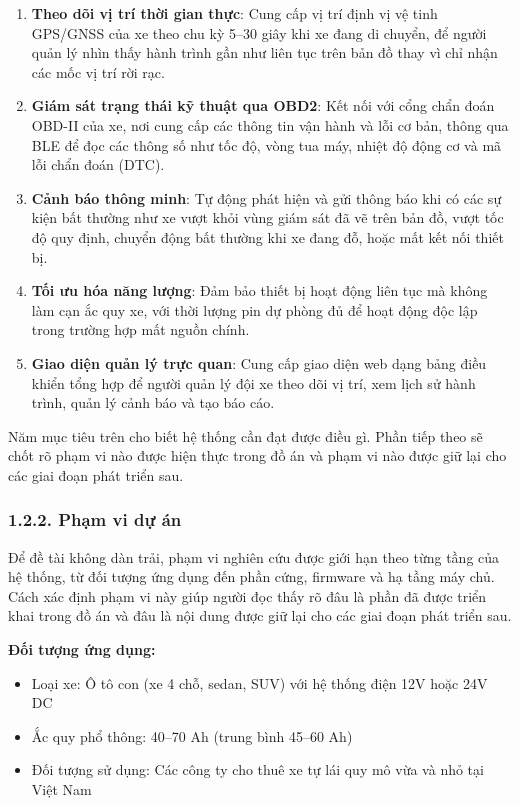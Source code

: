 \documentclass[a4paper]{extarticle}
\providecommand{\tightlist}{%
  \setlength{\itemsep}{0pt}\setlength{\parskip}{0pt}}
\begin{document}
\begin{enumerate}
\def\labelenumi{\arabic{enumi}.}
\tightlist
\item
  \textbf{Theo dõi vị trí thời gian thực}: Cung cấp vị trí định vị vệ
  tinh GPS/GNSS của xe theo chu kỳ 5--30 giây khi xe đang di chuyển, để
  người quản lý nhìn thấy hành trình gần như liên tục trên bản đồ thay
  vì chỉ nhận các mốc vị trí rời rạc.
\item
  \textbf{Giám sát trạng thái kỹ thuật qua OBD2}: Kết nối với cổng chẩn
  đoán OBD-II của xe, nơi cung cấp các thông tin vận hành và lỗi cơ bản,
  thông qua BLE để đọc các thông số như tốc độ, vòng tua máy, nhiệt độ
  động cơ và mã lỗi chẩn đoán (DTC).
\item
  \textbf{Cảnh báo thông minh}: Tự động phát hiện và gửi thông báo khi
  có các sự kiện bất thường như xe vượt khỏi vùng giám sát đã vẽ trên
  bản đồ, vượt tốc độ quy định, chuyển động bất thường khi xe đang đỗ,
  hoặc mất kết nối thiết bị.
\item
  \textbf{Tối ưu hóa năng lượng}: Đảm bảo thiết bị hoạt động liên tục mà
  không làm cạn ắc quy xe, với thời lượng pin dự phòng đủ để hoạt động
  độc lập trong trường hợp mất nguồn chính.
\item
  \textbf{Giao diện quản lý trực quan}: Cung cấp giao diện web dạng bảng
  điều khiển tổng hợp để người quản lý đội xe theo dõi vị trí, xem lịch
  sử hành trình, quản lý cảnh báo và tạo báo cáo.
\end{enumerate}

Năm mục tiêu trên cho biết hệ thống cần đạt được điều gì. Phần tiếp theo
sẽ chốt rõ phạm vi nào được hiện thực trong đồ án và phạm vi nào được
giữ lại cho các giai đoạn phát triển sau.

\subsubsection{1.2.2. Phạm vi dự
án}\label{122-phux1ea1m-vi-dux1ef1-uxe1n}

Để đề tài không dàn trải, phạm vi nghiên cứu được giới hạn theo từng
tầng của hệ thống, từ đối tượng ứng dụng đến phần cứng, firmware và
hạ tầng máy chủ. Cách xác định phạm vi này giúp người đọc thấy rõ đâu là phần đã
được triển khai trong đồ án và đâu là nội dung được giữ lại cho các giai
đoạn phát triển sau.

\textbf{Đối tượng ứng dụng:}

\begin{itemize}
\tightlist
\item
  Loại xe: Ô tô con (xe 4 chỗ, sedan, SUV) với hệ thống điện 12V hoặc
  24V DC
\item
  Ắc quy phổ thông: 40--70 Ah (trung bình 45--60 Ah)
\item
  Đối tượng sử dụng: Các công ty cho thuê xe tự lái quy mô vừa và nhỏ
  tại Việt Nam
\end{itemize}
\end{document}

